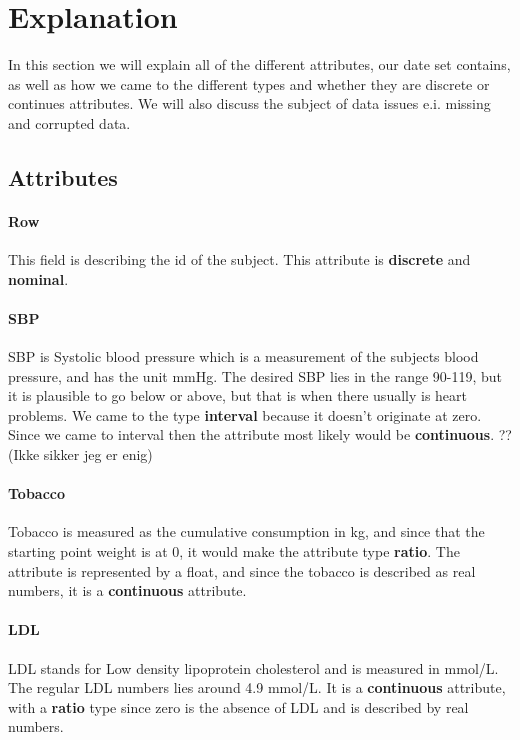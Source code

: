 \section{Explanation}

In this section we will explain all of the different attributes, our date set contains, as well as how we came to the different types and whether they are discrete or continues attributes. We will also discuss the subject of data issues e.i. missing and corrupted data.

\subsection{Attributes}

\paragraph{Row} This field is describing the id of the subject. This attribute is \textbf{discrete} and \textbf{nominal}.

\paragraph{SBP} SBP is Systolic blood pressure which is a measurement of the subjects blood pressure, and has the unit mmHg. The desired SBP lies in the range 90-119, but it is plausible to go below or above, but that is when there usually is heart problems.
We came to the type \textbf{interval} because it doesn't originate at zero. Since we came to interval then the attribute most likely would be \textbf{continuous}. ?? (Ikke sikker jeg er enig)

\paragraph{Tobacco} Tobacco is measured as the cumulative consumption in kg, and since that the starting point weight is at 0, it would make the attribute type \textbf{ratio}. The attribute is represented by a float, and since the tobacco is described as real numbers, it is a \textbf{continuous} attribute.

\paragraph{LDL} LDL stands for Low density lipoprotein cholesterol and is measured in mmol/L. The regular LDL numbers lies around 4.9 mmol/L. It is a \textbf{continuous} attribute, with a \textbf{ratio} type since zero is the absence of LDL and is described by real numbers.

